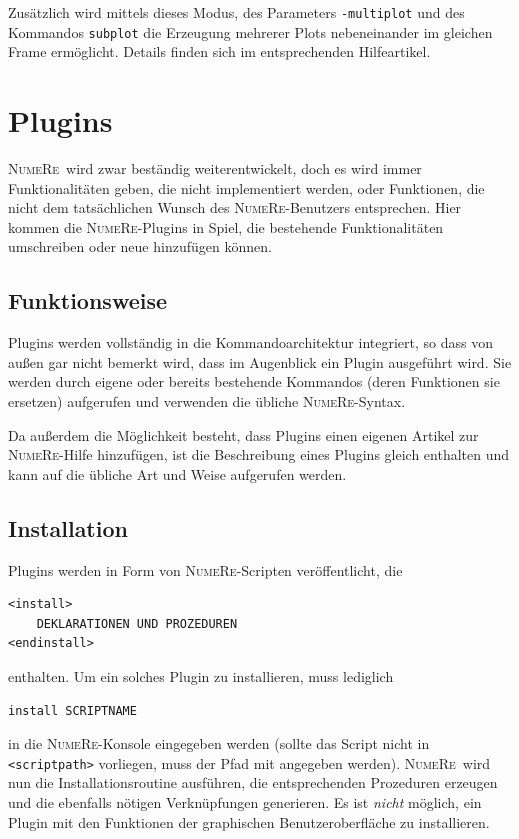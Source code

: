\documentclass[DIV=14,headsepline,footsepline]{scrbook}
\newcommand{\NR}{\textsc{Nu\-me\-Re}}
\begin{document}
			Zusätzlich wird mittels dieses Modus, des Parameters \lstinline+-multiplot+ und des Kommandos \lstinline+subplot+ die Erzeugung mehrerer Plots nebeneinander im gleichen Frame ermöglicht. Details finden sich im entsprechenden Hilfeartikel.
			
		\chapter{Plugins}
			\NR\ wird zwar beständig weiterentwickelt, doch es wird immer Funktionalitäten geben, die nicht implementiert werden, oder Funktionen, die nicht dem tatsächlichen Wunsch des \NR-Benutzers entsprechen. Hier kommen die \NR-Plugins in Spiel, die bestehende Funktionalitäten umschreiben oder neue hinzufügen können.
			\section{Funktionsweise}
				Plugins werden vollständig in die Kommandoarchitektur integriert, so dass von außen gar nicht bemerkt wird, dass im Augenblick ein Plugin ausgeführt wird. Sie werden durch eigene oder bereits bestehende Kommandos (deren Funktionen sie ersetzen) aufgerufen und verwenden die übliche \NR-Syntax.
				
				Da außerdem die Möglichkeit besteht, dass Plugins einen eigenen Artikel zur \NR-Hilfe hinzufügen, ist die Beschreibung eines Plugins gleich enthalten und kann auf die übliche Art und Weise aufgerufen werden.
			\section{Installation}
				Plugins werden in Form von \NR-Scripten veröffentlicht, die
				\begin{lstlisting}
<install>
	DEKLARATIONEN UND PROZEDUREN
<endinstall>
				\end{lstlisting}
				enthalten. Um ein solches Plugin zu installieren, muss lediglich
				\begin{lstlisting}
install SCRIPTNAME
				\end{lstlisting}
				in die \NR-Konsole eingegeben werden (sollte das Script nicht in \lstinline+<scriptpath>+ vorliegen, muss der Pfad mit angegeben werden). \NR\ wird nun die Installationsroutine ausführen, die entsprechenden Prozeduren erzeugen und die ebenfalls nötigen Verknüpfungen generieren. Es ist \emph{nicht} möglich, ein Plugin mit den Funktionen der graphischen Benutzeroberfläche zu installieren.
				
\end{document}

